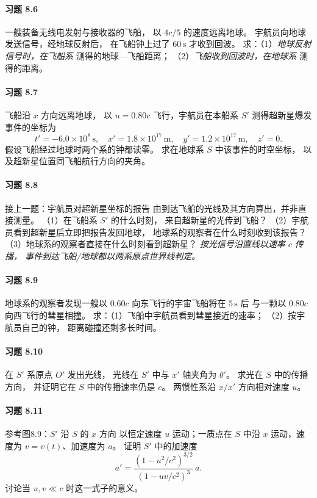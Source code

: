 \paragraph{习题 8.6}
一艘装备无线电发射与接收器的飞船，
以 \(4c/5\) 的速度远离地球。
宇航员向地球发送信号，经地球反射后，
在飞船钟上过了 \(60\,\mathrm s\) 才收到回波。
求：（1）\emph{地球反射信号时，在飞船系}
测得的地球—飞船距离；
（2）\emph{飞船收到回波时，在地球系}
测得的距离。

\paragraph{习题 8.7}
飞船沿 \(x\) 方向远离地球，
以 \(u=0.80c\) 飞行，宇航员在本船系 \(S'\)
测得超新星爆发事件的坐标为
\[
 t'=-6.0\times10^8\,\mathrm s,\quad
 x'=1.8\times10^{17}\,\mathrm m,\quad
 y'=1.2\times10^{17}\,\mathrm m,\quad z'=0.
\]
假设飞船经过地球时两个系的钟都读零。
求在地球系 \(S\) 中该事件的时空坐标，
以及超新星位置同飞船航行方向的夹角。

\paragraph{习题 8.8}
接上一题：宇航员对超新星坐标的报告
由到达飞船的光线及其方向算出，并非直接测量。
（1）在飞船系 \(S'\) 的什么时刻，
来自超新星的光传到飞船？
（2）宇航员看到超新星后立即把报告发回地球，
地球系的观察者在什么时刻收到该报告？
（3）地球系的观察者直接在什么时刻看到超新星？
\textit{按光信号沿直线以速率 \(c\) 传播，
事件到达飞船/地球都以两系原点世界线判定。}

\paragraph{习题 8.9}
地球系的观察者发现一艘以 \(0.60c\)
向东飞行的宇宙飞船将在 \(5\,\mathrm s\) 后
与一颗以 \(0.80c\) 向西飞行的彗星相撞。
求：（1）飞船中宇航员看到彗星接近的速率；
（2）按宇航员自己的钟，
距离碰撞还剩多长时间。

\paragraph{习题 8.10}
在 \(S'\) 系原点 \(O'\) 发出光线，
光线在 \(S'\) 中与 \(x'\) 轴夹角为 \(\theta'\)。
求光在 \(S\) 中的传播方向，
并证明它在 \(S\) 中的传播速率仍是 \(c\)。
两惯性系沿 \(x/x'\) 方向相对速度 \(u\)。

\paragraph{习题 8.11}
参考图8.9：\(S'\) 沿 \(S\) 的 \(x\) 方向
以恒定速度 \(u\) 运动；一质点在 \(S\)
中沿 \(x\) 运动，速度为 \(v=v(t)\)、加速度为 \(a\)。
证明 \(S'\) 中的加速度
\[
 \boxed{a'=\frac{(1-u^2/c^2)^{3/2}}
 {(1-uv/c^2)^3}\,a}.
\]
讨论当 \(u,v\ll c\) 时这一式子的意义。

